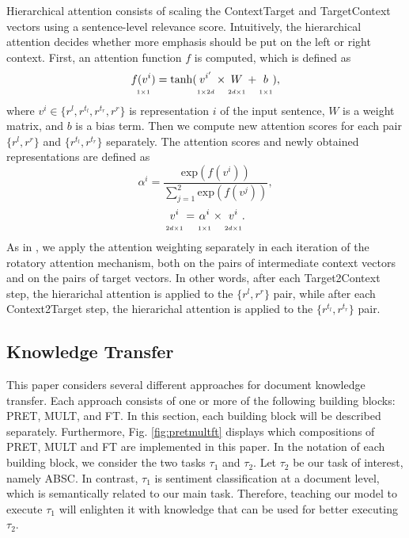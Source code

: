 \documentclass[runningheads]{llncs}
\newcommand{\undset}[2]{\underset{\scriptscriptstyle #1}{#2\strut}}
\begin{document}
Hierarchical attention consists of scaling the Context\-Target and Target\-Context vectors using a sentence-level relevance score. Intuitively, the hierarchical attention decides whether more emphasis should be put on the left or right context. 
First, an attention function $f$ is computed, which is defined as
\begin{equation}
    \undset{1\times 1}{f(v^i)}=\mathrm{tanh}(\undset{1\times 2d}{v^{i'}}\times \undset{2d\times 1}{W}+\undset{1\times 1}{b}),
\end{equation}
where $v^i\in \{r^l, r^{t_l}, r^{t_r}, r^r\}$ is representation $i$ of the input sentence, $W$ is a weight matrix, and $b$ is a bias term. Then we compute new attention scores for each pair $\{r^l,r^r\}$ and $\{r^{t_l},r^{t_r}\}$ separately. The attention scores and newly obtained representations are defined as
\begin{equation}
    \alpha^i=\frac{\mathrm{exp}(f(v^i))}{\sum_{j=1}^2 \mathrm{exp}(f(v^j))},
\end{equation}
\begin{equation}
    \undset{2d\times 1}{v^i}=\undset{1\times 1}{\alpha^i}\times \undset{2d\times 1}{v^i}.
\end{equation}
As in \cite{Trusca2020}, we apply the attention weighting separately in each iteration of the rotatory attention mechanism, both on the pairs of intermediate context vectors and on the pairs of target vectors. In other words, after each Target2Context step, the hierarichal attention is applied to the $\{r^l,r^r\}$ pair, while after each Context2Target step, the hierarichal attention is applied to the $\{r^{t_l},r^{t_r}\}$ pair.

\subsection{Knowledge Transfer}
This paper considers several different approaches for document knowledge transfer. Each approach consists of one or more of the following building blocks: PRET, MULT, and FT. In this section, each building block will be described separately. Furthermore, Fig. \ref{fig:pretmultft} displays which compositions of PRET, MULT and FT are implemented in this paper. In the notation of each building block, we consider the two tasks $\tau_1$ and $\tau_2$. Let $\tau_2$ be our task of interest, namely ABSC. In contrast, $\tau_1$ is sentiment classification at a document level, which is semantically related to our main task. Therefore, teaching our model to execute $\tau_1$ will enlighten it with knowledge that can be used for better executing $\tau_2$. 
\end{document}
